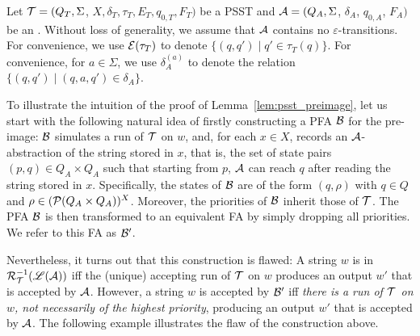         Let $\mathcal{T} = (Q_T, \Sigma$, $X, \delta_T, \tau_T, E_T,  q_{0, T}, F_T)$ be a PSST  and $\mathcal{A}
        = (Q_A, \Sigma$, $\delta_A$, $q_{0, A}$, $F_A)$ be an \FA{}. Without loss of generality, we assume that $\mathcal{A}$ contains no $\varepsilon$-transitions. For convenience, we use $\mathcal{E}(\tau_T)$ to denote $\{(q, q') \mid q' \in \tau_T(q)\}$. For convenience, for $a \in \Sigma$, we use $\delta^{(a)}_A$ to denote the  relation $\{(q, q') \mid (q, a, q') \in \delta_A\}$.

        To illustrate the intuition of the proof of Lemma~\ref{lem:psst_preimage}, let us start with the following natural idea of firstly constructing a PFA $\mathcal{B}$ for the pre-image: $\mathcal{B}$ simulates a run of $\mathcal{T}$ on $w$, and, for each $x \in X$, records an $\mathcal{A}$-abstraction of the string stored in $x$, that is, the set of state pairs $(p, q) \in Q_A \times Q_A$ such that starting from $p$, $\mathcal{A}$ can reach $q$ after reading the string stored in $x$. Specifically, the states of $\mathcal{B}$ are of the form $(q, \rho)$ with $q \in Q$ and $\rho \in (\mathcal{P}(Q_A \times Q_A ))^{X}$. Moreover, the priorities of $\mathcal{B}$ inherit those of $\mathcal{T}$. The PFA $\mathcal{B}$ is then transformed to an equivalent FA by simply dropping all priorities. We refer to this FA as $\mathcal{B}'$.

        Nevertheless, it turns out that this construction is flawed: A string $w$ is in $\mathcal{R}^{-1}_{\mathcal{T}}(\mathscr{L}(\mathcal{A}))$ iff the (unique) accepting run of $\mathcal{T}$ on $w$ produces an output $w'$ that is accepted by $\mathcal{A}$. However, a string $w$ is accepted by $\mathcal{B}'$ iff \emph{there is a run of $\mathcal{T}$ on $w$, not necessarily of the highest priority}, producing an output $w'$ that is accepted by $\mathcal{A}$. The following example illustrates the flaw of the construction above.

